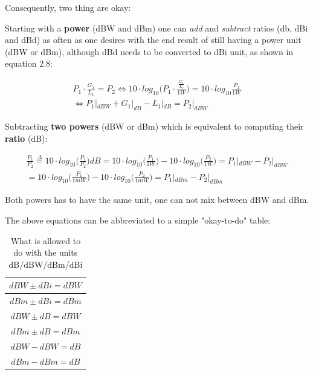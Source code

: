 Consequently, two thing are okay: 

Starting with a \textbf{power} (dBW and dBm) one can \textit{add} and \textit{subtract} ratios (db, dBi and dBd) as often as one desires with the end result of still having a power unit (dBW or dBm), although dBd needs to be converted to dBi unit, as shown in equation 2.8: 

\begin{equation}
\begin{split}
    P_1 \cdot \frac{G_1}{L_1} = P_2 \Leftrightarrow 10 \cdot log_{10}\Big(P_1 \cdot \frac{\frac{G_1}{L_1}}{1W}\Big) = 10 \cdot log_{10} \frac{P_2}{1W}\\
    \Leftrightarrow P_1|_{dBW} + G_1|_{dB} - L_1|_{dB} = P_2|_{dBW}
\end{split}
\end{equation}

Subtracting \textbf{two powers} (dBW or dBm) which is equivalent to computing their \textbf{ratio} (dB):

\begin{equation}
\begin{split}
    \frac{P_1}{P_2} \overset{\Delta}{=} 10 \cdot log_{10}\Big(\frac{P_1}{P_2}\Big) dB = 10 \cdot log_{10}\Big(\frac{P_1}{1W}\Big) - 10 \cdot log_{10}\Big(\frac{P_2}{1W}\Big) = P_1|_{dBW} - P_2|_{dBW}\\
    = 10 \cdot log_{10}\Big(\frac{P_1}{1mW}\Big) - 10 \cdot log_{10}\Big(\frac{P_2}{1mW}\Big) = P_1|_{dBm} - P_2|_{dBm}
\end{split}
\end{equation}

Both powers has to have the same unit, one can not mix between dBW and dBm. 

The above equations can be abbreviated to a simple "okay-to-do" table:

\begin{table}[h!]
\centering
\begin{tabular}{|c|}
\hline
$dBW  \pm dBi = dBW$\\
\hline
$dBm \pm  dBi = dBm$ \\ 
\hline
$dBW  \pm  dB = dBW$ \\ 
\hline
$dBm \pm dB = dBm$ \\  
\hline
$dBW - dBW = dB$ \\
\hline
$dBm - dBm = dB$ \\
\hline
\end{tabular}
\caption{What is allowed to do with the units dB/dBW/dBm/dBi}
\label{table:1}
\end{table}

